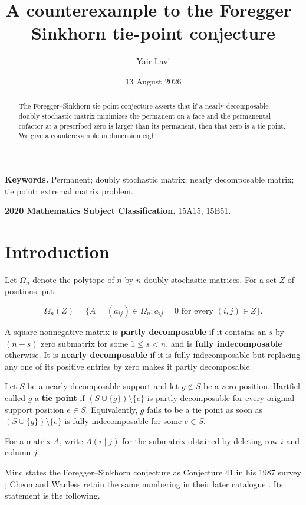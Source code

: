 \documentclass[11pt]{article}
\title{A counterexample to the Foregger--Sinkhorn tie-point conjecture}
\author{Yair Lavi}
\date{13 August 2026}
\theoremstyle{definition}
\begin{document}
\maketitle

\begin{abstract}

The Foregger--Sinkhorn tie-point conjecture asserts that if a nearly
decomposable doubly stochastic matrix minimizes the permanent on a face and
the permanental cofactor at a prescribed zero is larger than its permanent,
then that zero is a tie point. We give a counterexample in dimension eight.
\end{abstract}

\noindent\textbf{Keywords.} Permanent; doubly stochastic matrix; nearly
decomposable matrix; tie point; extremal matrix problem.

\noindent\textbf{2020 Mathematics Subject Classification.} 15A15, 15B51.

\section{Introduction}

Let \(\Omega_n\) denote the polytope of \(n\)-by-\(n\) doubly stochastic
matrices. For a set \(Z\) of positions, put

\[
\Omega_n(Z)=\{A=(a_{ij})\in\Omega_n:a_{ij}=0
\text{ for every }(i,j)\in Z\}.
\]

A square nonnegative matrix is \textbf{partly decomposable} if it contains an
\(s\)-by-\((n-s)\) zero submatrix for some \(1\le s<n\), and is \textbf{fully
indecomposable} otherwise. It is \textbf{nearly decomposable} if it is fully
indecomposable but replacing any one of its positive entries by zero makes it
partly decomposable.

Let \(S\) be a nearly decomposable support and let \(g\notin S\) be a zero
position. Hartfiel \cite[p.~224]{hartfiel1971} called \(g\) a \textbf{tie point} if
\((S\cup\{g\})\setminus\{e\}\) is partly decomposable for every original
support position \(e\in S\). Equivalently, \(g\) fails to be a tie point as
soon as \((S\cup\{g\})\setminus\{e\}\) is fully indecomposable for some
\(e\in S\).

For a matrix \(A\), write \(A(i\mid j)\) for the submatrix obtained by
deleting row \(i\) and column \(j\).

Minc states the Foregger--Sinkhorn conjecture as Conjecture 41 in his 1987
survey \cite[p.~135]{minc1987}; Cheon and Wanless retain the same numbering
in their later catalogue \cite[p.~333]{cheonwanless2005}. Its statement is
the following.
\end{document}

